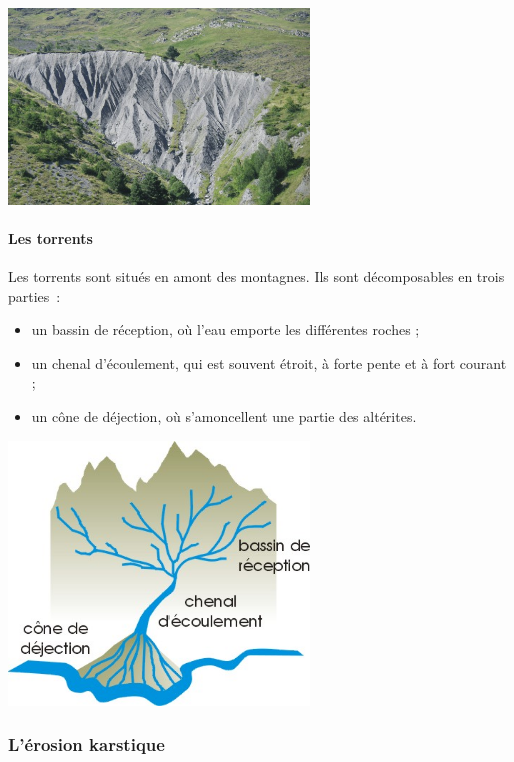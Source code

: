 \documentclass[a4paper,11pt]{article}
\begin{document}
\begin{center}
  \includegraphics[width=8cm]{Images/Erosion/bad_lands.jpg}
\end{center}

\paragraph{Les torrents}
\medbreak
Les torrents sont situés en amont des montagnes.
Ils sont décomposables en trois parties~:
\begin{itemize}
  \item un bassin de réception, où l'eau emporte les différentes roches ;
  \item un chenal d'écoulement, qui est souvent étroit, à forte pente et à fort courant ;
  \item un cône de déjection, où s'amoncellent une partie des altérites.
\end{itemize}

\begin{center}
  \includegraphics[width=8cm]{Images/Erosion/torrent2.jpg}
\end{center}

\subsubsection{L'érosion karstique}
\end{document}
